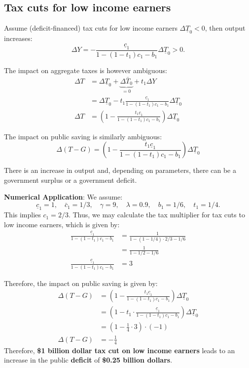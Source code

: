 \documentclass[]{book}
\theoremstyle{definition}
\theoremstyle{definition}
\theoremstyle{definition}
\theoremstyle{remark}
\begin{document}
\subsection{Tax cuts for low income
earners}\label{tax-cuts-for-low-income-earners}

Assume (deficit-financed) tax cuts for low income earners
\(\Delta\underline{T}_{0}<0\), then output increases:
\[\Delta Y=-\frac{\underline{c}_{1}}{1-\left(1-t_{1}\right)c_{1}-b_{1}}\Delta\underline{T}_{0}>0.\]

The impact on aggregate taxes is however ambiguous: \[
\begin{aligned}
\Delta T    &=\Delta\underline{T}_{0}+\underbrace{\Delta\bar{T}_{0}}_{=0}+t_1\Delta Y\\
&=\Delta\underline{T}_{0}-t_1 \frac{\underline{c}_{1}}{1-\left(1-t_{1}\right)c_{1}-b_{1}}\Delta\underline{T}_{0}\\
\Delta T    &=\left(1-\frac{t_1\underline{c}_{1}}{1-\left(1-t_{1}\right)c_{1}-b_{1}}\right)\Delta\underline{T}_{0}
\end{aligned}
\]

The impact on public saving is similarly ambiguous:
\[\Delta\left(T-G\right)=\left(1-\frac{t_1\underline{c}_{1}}{1-\left(1-t_{1}\right)c_{1}-b_{1}}\right)\Delta\underline{T}_{0}\]

There is an increase in output and, depending on parameters, there can
be a government surplus or a government deficit.

\textbf{Numerical Application}: We assume:
\[\underline{c}_{1}=1, \quad \bar{c}_{1}=1/3,\quad \gamma=9, \quad\lambda=0.9,\quad b_1=1/6, \quad t_1=1/4.\]
This implies \(c_1=2/3.\) Thus, we may calculate the tax multiplier for
tax cuts to low income earners, which is given by: \[
\begin{aligned}
\frac{\underline{c}_{1}}{1-(1-t_1)c_{1}-b_{1}} &= \frac{1}{1-(1-1/4) \cdot 2/3-1/6}\\
&= \frac{1}{1-1/2-1/6}\\
\frac{\underline{c}_{1}}{1-(1-t_1)c_{1}-b_{1}} &=3
\end{aligned}
\]

Therefore, the impact on public saving is given by: \[
\begin{aligned}
\Delta\left(T-G\right)&=\left(1-\frac{t_1\underline{c}_{1}}{1-\left(1-t_{1}\right)c_{1}-b_{1}}\right)\Delta\underline{T}_{0}\\
&=\left(1-t_1 \cdot \frac{\underline{c}_{1}}{1-\left(1-t_{1}\right)c_{1}-b_{1}}\right)\Delta\underline{T}_{0}\\
&=\left(1-\frac{1}{4} \cdot 3\right) \cdot (-1)\\
\Delta\left(T-G\right)&=-\frac{1}{4}
\end{aligned}
\] Therefore, \textbf{\$1 billion dollar tax cut on low income earners}
leads to an increase in the public \textbf{deficit} of \textbf{\$0.25
billion dollars}.
\end{document}
